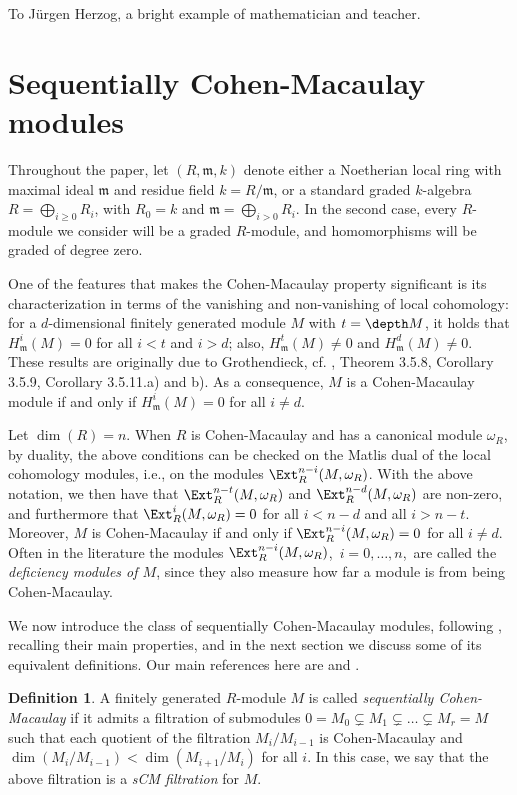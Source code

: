 \documentclass[12pt]{amsart}
\theoremstyle{definition}
\theoremstyle{definition}
\newtheorem{definition}[theorem]{Definition}
\newcommand{\m}{\mathfrak{m}}
\def\frk{\mathfrak}               %
\def\mm{{\frk m}}
\renewcommand{\geq}{\geqslant}
\begin{document}
\smallskip

To J\"urgen Herzog, a bright example of mathematician and teacher.


\section{Sequentially Cohen-Macaulay modules} 


Throughout the paper, let $(R,\m,k)$ denote either a Noetherian local ring with maximal ideal $\m$ and residue field $k=R/\m$, or a standard graded $k$-algebra $R=\bigoplus_{i \geq 0} R_i$, with $R_0=k$ and $\m = \bigoplus_{i>0} R_i$. In the second case, every $R$-module we consider will be a graded $R$-module, and homomorphisms will be graded of degree zero. 

One of the features that makes the Cohen-Macaulay property significant is its characterization in terms of the vanishing and non-vanishing of local cohomology: for a $d$-dimensional finitely generated module $M$ with $t=\depth M$, it holds that $H^i_\mm(M)=0$ for all $i<t$ and $i>d$;  also,  $H^t_\mm(M) \neq 0$ and $ H^d_\mm(M)\neq 0$. These results are originally due to Grothendieck, cf. \cite{BH93}, Theorem 3.5.8, Corollary 3.5.9, Corollary 3.5.11.a) and b). As a consequence, $M$ is a Cohen-Macaulay module if and only if $H^i_\mm(M)=0$ for all $i\ne d$. 


Let $\dim(R)=n$. When $R$ is Cohen-Macaulay and has a canonical module $\omega_R$, by duality,  the above conditions can be checked on the Matlis dual of the local cohomology modules, i.e., on the modules $\Ext^{n-i}_R(M,\omega_R)$. With the above notation, we then have that $\Ext_R^{n-t}(M,\omega_R)$ and $\Ext_R^{n-d}(M,\omega_R)$ are non-zero, and furthermore that $\Ext^i_R(M,\omega_R)=0$ for all $i<n-d$ and all $i>n-t$. Moreover, $M$ is Cohen-Macaulay if and only if $\Ext^{n-i}_R(M,\omega_R) = 0$ for all $i \ne d$. Often in the literature the modules $\Ext^{n-i}_R(M,\omega_R)$,\,  $i=0,\ldots,n$,\, are called the {\em deficiency modules of $M$}, since they also measure how far a module is from being Cohen-Macaulay.



We now introduce the class of sequentially Cohen-Macaulay modules, following \cite{St96}, recalling their main properties, and in the next section we discuss some of its equivalent definitions. Our main references here are \cite{HS01} and \cite{Sch99}. 

\begin{definition}
A finitely generated $R$-module $M$ is called {\em sequentially Cohen-Macaulay} if it admits a filtration of submodules $0=M_0\subsetneq M_1\subsetneq \ldots \subsetneq M_r=M$ such that each quotient of the filtration $M_{i}/M_{i-1}$ is Cohen-Macaulay and $\dim (M_{i}/M_{i-1}) < \dim (M_{i+1}/M_i)$ for all $i$. In this case, we say that the above filtration is a {\em sCM filtration} for $M$.
\end{definition}
\end{document}
